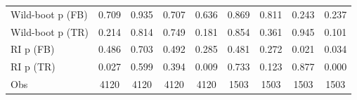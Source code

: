 {\begin{tabular}{l*{8}{c}}
Wild-boot p (FB)    &       0.709         &       0.935         &       0.707         &       0.636         &       0.869         &       0.811         &       0.243         &       0.237         \\
Wild-boot p (TR)    &       0.214         &       0.814         &       0.749         &       0.181         &       0.854         &       0.361         &       0.945         &       0.101         \\
RI p (FB)           &       0.486         &       0.703         &       0.492         &       0.285         &       0.481         &       0.272         &       0.021         &       0.034         \\
RI p (TR)           &       0.027         &       0.599         &       0.394         &       0.009         &       0.733         &       0.123         &       0.877         &       0.000         \\
Obs                 &        4120         &        4120         &        4120         &        4120         &        1503         &        1503         &        1503         &        1503         \\
\bottomrule
\end{tabular}
}
